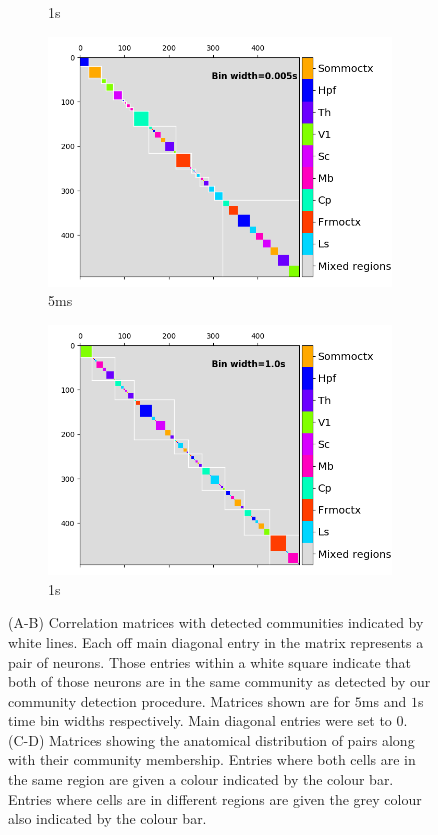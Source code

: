 \begin{figure}[p]
\begin{subfigure}[h]{0.5\linewidth}
      \caption{1s}
      \label{fig:consensus_cluster_1s}
    \end{subfigure}
    \begin{subfigure}[h]{0.5\linewidth}
      \includegraphics[width=\linewidth]{figures/eight_probe/Krebs_0p005_regional_cluster_map.png}
      \caption{5ms}
      \label{fig:regional_cluster_map_5ms}
    \end{subfigure}
    \begin{subfigure}[h]{0.5\linewidth}
      \includegraphics[width=\linewidth]{figures/eight_probe/Krebs_1p0_regional_cluster_map.png}
      \caption{1s}
      \label{fig:regional_cluster_map_1s}
    \end{subfigure}
    \caption{(A-B) Correlation matrices with detected communities indicated by white lines. Each off main diagonal entry in the matrix represents a pair of neurons. Those entries within a white square indicate that both of those neurons are in the same community as detected by our community detection procedure. Matrices shown are for $5$ms and $1$s time bin widths respectively. Main diagonal entries were set to $0$. (C-D) Matrices showing the anatomical distribution of pairs along with their community membership. Entries where both cells are in the same region are given a colour indicated by the colour bar. Entries where cells are in different regions are given the grey colour also indicated by the colour bar.}

\end{figure}
